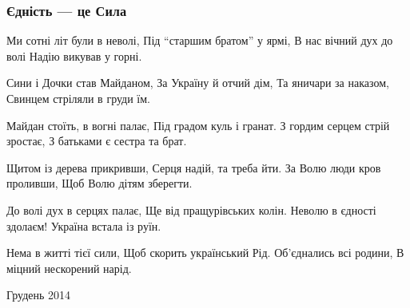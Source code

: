  
 
 

\subsubsection{Єдність --- це Сила}
\label{sec:poetry.rus.sokor.jednist_ce_syla}

Ми сотні літ були в неволі,
Під “старшим братом” у ярмі,
В нас вічний дух до волі
Надію викував у горні.

Сини і Дочки став Майданом,
За Україну й отчий дім,
Та яничари за наказом,
Свинцем стріляли в груди їм.

Майдан стоїть, в вогні палає,
Під градом куль і гранат.
З гордим серцем стрій зростає,
З батьками є сестра та брат.

Щитом із дерева прикривши,
Серця надій, та треба йти.
За Волю люди кров проливши,
Щоб Волю дітям зберегти.

До волі дух в серцях палає,
Ще від пращурівських колін.
Неволю в єдності здолаєм!
Україна встала із руїн.

Нема в житті тієї сили,
Щоб скорить український Рід.
Об'єднались всі родини,
В міцний нескорений нарід.

Грудень 2014
